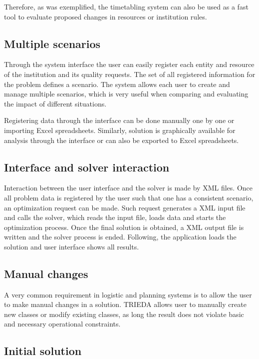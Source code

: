 Therefore, as was exemplified, the timetabling system can also be used as a fast  tool to evaluate proposed changes in resources or institution rules.


\subsection{Multiple scenarios}
\label{subsec:scenarios}

Through the system interface the user can easily register each entity and resource of the institution and its quality requests. The set of all registered information for the problem defines a scenario. The system allows each user to create and manage multiple scenarios, which is very useful when comparing and evaluating the impact of different situations.

Registering data through the interface can be done manually one by one or importing Excel spreadsheets. Similarly, solution is graphically available for analysis through the interface or can also be exported to Excel spreadsheets.


\subsection{Interface and solver interaction}
\label{subsec:interaction}

Interaction between the user interface and the solver is made by XML files. Once all problem data is registered by the user such that one has a consistent scenario, an optimization request can be made. Such request generates a XML input file and calls the solver, which reads the input file, loads data and starts the optimization process. Once the final solution is obtained, a XML output file is written and the solver process is ended. Following, the application loads the solution and user interface shows all results.


\subsection{Manual changes}
\label{subsec:manual}

A very common requirement in logistic and planning systems is to allow the user to make manual changes in a solution. TRIEDA allows user to manually create new classes or modify existing classes, as long the result does not violate basic and necessary operational constraints.


\subsection{Initial solution}
\label{subsec:initsolution}


